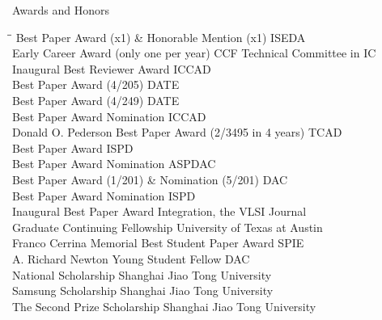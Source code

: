 
\begin{rSection}{Awards and Honors}
\begin{tabbing}
\hspace{3.8in}\= \hspace{2.6in}\= \kill
Best Paper Award (x1) \& Honorable Mention (x1) \> ISEDA  \\
Early Career Award (only one per year) \> CCF Technical Committee in IC  \\
Inaugural Best Reviewer Award \> ICCAD  \\
Best Paper Award (4/205) \> DATE  \\
Best Paper Award (4/249) \> DATE  \\
Best Paper Award Nomination \> ICCAD  \\
Donald O. Pederson Best Paper Award (2/3495 in 4 years) \> TCAD  \\
Best Paper Award \> ISPD  \\
Best Paper Award Nomination \> ASPDAC  \\
Best Paper Award (1/201) \& Nomination (5/201) \> DAC  \\
Best Paper Award Nomination \> ISPD  \\
Inaugural Best Paper Award \> Integration, the VLSI Journal  \\
Graduate Continuing Fellowship \> University of Texas at Austin  \\
Franco Cerrina Memorial Best Student Paper Award \> SPIE  \\
A. Richard Newton Young Student Fellow \> DAC  \\
    National Scholarship \> Shanghai Jiao Tong University  \\
    Samsung Scholarship \> Shanghai Jiao Tong University  \\
    The Second Prize Scholarship \> Shanghai Jiao Tong University 
\end{tabbing}
\end{rSection}

